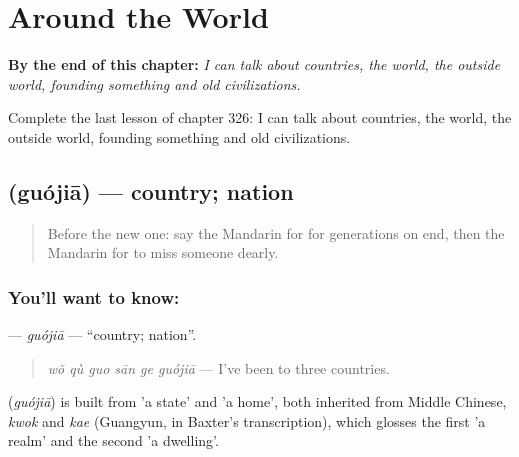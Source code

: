 
\chapter{Around the World}
\label{ch:zh-around-the-world}

\begin{chapteropening}
\textbf{By the end of this chapter:} \emph{I can talk about countries, the world, the outside world, founding something and old civilizations.}

Complete the last lesson of chapter 326: I can talk about countries, the world, the outside world, founding something and old civilizations.
\end{chapteropening}

\section[\texorpdfstring{\zh{国家} (guójiā)}{国家 (guójiā)}]{ (guójiā) — country; nation}

\label{lesson:ZH-C326-guojia}



\begin{quote}
Before the new one: say the Mandarin for for generations on end, then the Mandarin for to miss someone dearly.
\end{quote}

\subsection*{You'll want to know: }
\textbf{} — \emph{guójiā} — \textquotedblleft{}country; nation\textquotedblright{}.

\begin{quote}
\textbf{} \emph{wǒ qù guo sān ge guójiā} — I've been to three countries.
\end{quote}

\begin{cousinweb}
\textbf{} (\emph{guójiā}) is built from  'a state' and  'a home', both inherited from Middle Chinese, \emph{kwok} and \emph{kae} (Guangyun, in Baxter's transcription), which glosses the first 'a realm' and the second 'a dwelling'.
\end{cousinweb}

